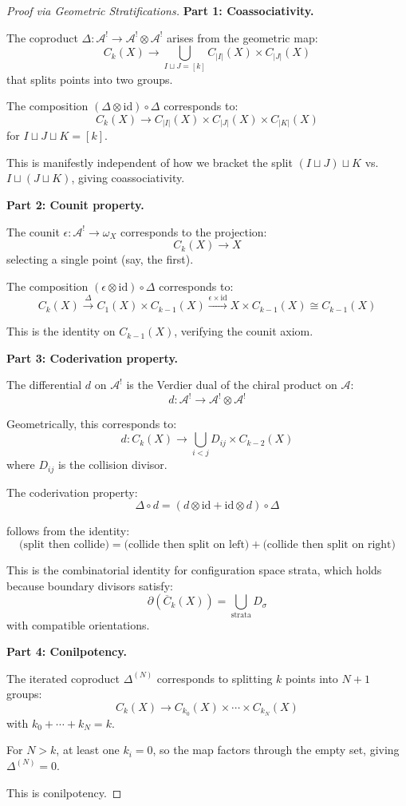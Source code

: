 \begin{proof}[Proof via Geometric Stratifications]
\textbf{Part 1: Coassociativity.}

The coproduct $\Delta: \mathcal{A}^! \to \mathcal{A}^! \otimes \mathcal{A}^!$ arises from the geometric map:
$$C_k(X) \to \bigcup_{I \sqcup J = [k]} C_{|I|}(X) \times C_{|J|}(X)$$
that splits points into two groups.

The composition $(\Delta \otimes \text{id}) \circ \Delta$ corresponds to:
$$C_k(X) \to C_{|I|}(X) \times C_{|J|}(X) \times C_{|K|}(X)$$
for $I \sqcup J \sqcup K = [k]$.

This is manifestly independent of how we bracket the split $(I \sqcup J) \sqcup K$ vs. $I \sqcup (J \sqcup K)$, giving coassociativity.

\textbf{Part 2: Counit property.}

The counit $\epsilon: \mathcal{A}^! \to \omega_X$ corresponds to the projection:
$$C_k(X) \to X$$
selecting a single point (say, the first).

The composition $(\epsilon \otimes \text{id}) \circ \Delta$ corresponds to:
$$C_k(X) \xrightarrow{\Delta} C_1(X) \times C_{k-1}(X) \xrightarrow{\epsilon \times \text{id}} X \times C_{k-1}(X) \cong C_{k-1}(X)$$

This is the identity on $C_{k-1}(X)$, verifying the counit axiom.

\textbf{Part 3: Coderivation property.}

The differential $d$ on $\mathcal{A}^!$ is the Verdier dual of the chiral product on $\mathcal{A}$:
$$d: \mathcal{A}^! \to \mathcal{A}^! \otimes \mathcal{A}^!$$

Geometrically, this corresponds to:
$$d: C_k(X) \to \bigcup_{i<j} D_{ij} \times C_{k-2}(X)$$
where $D_{ij}$ is the collision divisor.

The coderivation property:
$$\Delta \circ d = (d \otimes \text{id} + \text{id} \otimes d) \circ \Delta$$

follows from the identity:
$$\text{(split then collide)} = \text{(collide then split on left)} + \text{(collide then split on right)}$$

This is the combinatorial identity for configuration space strata, which holds because boundary divisors satisfy:
$$\partial(\overline{C}_k(X)) = \bigcup_{\text{strata}} D_{\sigma}$$
with compatible orientations.

\textbf{Part 4: Conilpotency.}

The iterated coproduct $\Delta^{(N)}$ corresponds to splitting $k$ points into $N+1$ groups:
$$C_k(X) \to C_{k_0}(X) \times \cdots \times C_{k_N}(X)$$
with $k_0 + \cdots + k_N = k$.

For $N > k$, at least one $k_i = 0$, so the map factors through the empty set, giving $\Delta^{(N)} = 0$.

This is conilpotency.
\end{proof}

